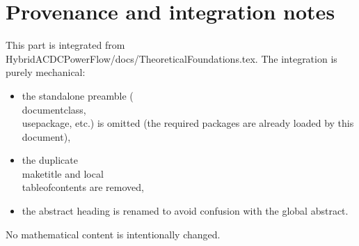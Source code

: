 \documentclass[11pt]{article}
\def\code#1{#1}%
\def\file#1{#1}%
\newcommand{\code}[1]{\nolinkurl{#1}}
\newcommand{\file}[1]{\path{#1}}
\begin{document}
\section{Provenance and integration notes}
This part is integrated from \file{HybridACDCPowerFlow/docs/TheoreticalFoundations.tex}. The integration is purely mechanical:
\begin{itemize}[leftmargin=*]
  \item the standalone preamble (\code{\\documentclass}, \code{\\usepackage}, etc.) is omitted (the required packages are already loaded by this document),
  \item the duplicate \code{\\maketitle} and local \code{\\tableofcontents} are removed,
  \item the abstract heading is renamed to avoid confusion with the global abstract.
\end{itemize}
No mathematical content is intentionally changed.

{\renewcommand{\abstractname}{Theory Abstract}
\begin{abstract}
This document presents the theoretical foundations for enhanced hybrid AC/DC power flow analysis with support for multiple islanded systems, reactive power limit handling, automatic swing bus selection, intelligent converter control mode switching, and distributed slack bus modeling. We derive the mathematical formulations, prove convergence properties, and establish the conditions under which the enhanced algorithms preserve physical feasibility and ensure solution uniqueness. The distributed slack bus model enables realistic representation of multi-generator AGC systems for modern power system analysis.

\textbf{Version 0.4.0 adds three power flow solution algorithms}: (1) Simplified Newton-Raphson with post-processing distributed slack (fastest, 56\% convergence), (2) Full Jacobian with integrated distributed slack (exact enforcement, 57\% convergence), and (3) Hybrid solver combining NR speed with NLsolve robustness (91\% convergence, only 33\% overhead). Empirical validation on 100 Monte Carlo scenarios proves solution equivalence between NLsolve and Simplified NR (0.0\% voltage difference), confirming that robustness improvements stem from initialization handling, not algorithmic differences. The hybrid approach achieves 62.5\% relative improvement in convergence while maintaining production-grade performance.
\end{abstract}}
\end{document}
